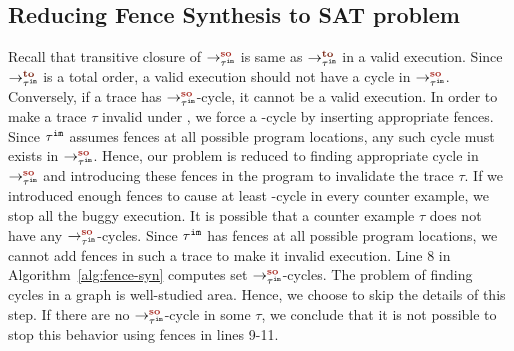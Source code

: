 \subsection{Reducing Fence Synthesis to SAT problem}
Recall that transitive closure of $ \so{\im{\tau}}{}{} $ is same as 
$ \to{\im{\tau}}{}{} $ in a valid \cc execution. Since  
$ \to{\im{\tau}}{}{} $ is a total order, a valid \cc execution should not 
have a cycle in $ \so{\im{\tau}}{}{} $. Conversely, if a trace has 
$ \so{\im{\tau}}{}{} $-cycle, it cannot be a valid \cc execution. 
In order to make a trace $ \tau $ invalid under \cc, we force a \lso-cycle by inserting appropriate fences. 
Since $ {\tau}^{\mathtt{im}} $ assumes \mosc fences at all possible program locations,
any such cycle must exists in $ \so{\im{\tau}}{}{} $. 
Hence, our problem is reduced to finding appropriate cycle in 
$\so{\im{\tau}}{}{} $ and introducing these fences in the program to 
invalidate the trace $ \tau $.
If we introduced enough fences to cause at least \lso-cycle in 
every counter example, we stop all the buggy execution. 
It is possible that a counter example $ \tau $ does not have any 
$\so{\im{\tau}}{}{}$-cycles. Since $ {\tau}^{\mathtt{im}} $ has \mosc fences at all 
possible program locations, we cannot add fences in such a trace to 
make it invalid \cc execution. 
Line 8 in Algorithm~\ref{alg:fence-syn} computes set $\so{\im{\tau}}{}{}$-cycles. 
The problem of finding cycles in a graph is well-studied area. Hence, we 
choose to skip the details of this step.
If there are no $\so{\im{\tau}}{}{}$-cycle in some $ \tau $, we conclude 
that it is not possible to stop this behavior using \cc fences in lines 
9-11.


